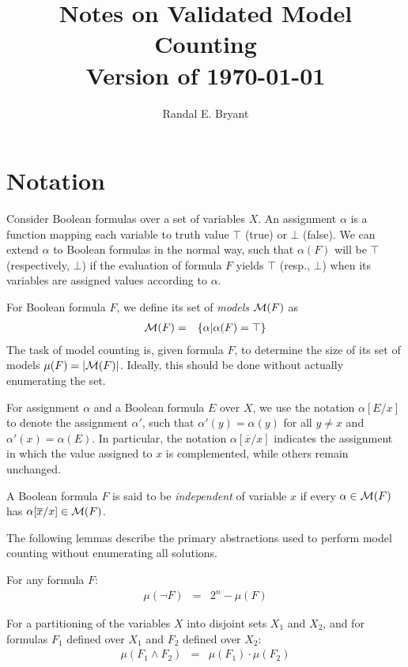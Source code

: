 \documentclass{llncs}
\title{Notes on Validated Model Counting \\ Version of \today}
\author{Randal E. Bryant}
\institute{
Computer Science Department \\
Carnegie Mellon University, Pittsburgh, PA, United States
}
\newcommand{\tautology}{\top}
\newcommand{\nil}{\bot}
\newcommand{\obar}[1]{\overline{#1}}
\newcommand{\interp}{\alpha}
\newcommand{\interpset}[1]{{\cal M}(#1)}
\newcommand{\mcount}{\mu}
\newcommand{\subs}[2]{[#2/#1]}
\newcommand{\subsflip}[1]{\subs{#1}{\obar{#1}}}
\begin{document}
\maketitle

\section{Notation}

Consider Boolean formulas over a set of variables $X$.  An
assignment $\interp$ is a function mapping each variable to 
truth value $\tautology$ (true) or $\nil$ (false).  We can extend
$\interp$ to Boolean formulas in the normal way, such that
$\interp(F)$ will be $\tautology$ (respectively, $\nil$) if the
evaluation of formula $F$ yields $\tautology$ (resp., $\nil$) when its
variables are assigned values according to $\interp$.

For Boolean formula $F$, we define its set of {\em models} $\interpset{F}$ as
\begin{eqnarray}
\interpset{F} & = & \{ \interp | \interp(F) = \tautology \}
\end{eqnarray}
The task of model counting is, given formula $F$, to determine the size of its set of models
$\mcount(F) = |\interpset{F}|$.  Ideally, this should be done without actually enumerating the set.

For assignment $\interp$ and a Boolean formula $E$ over $X$, we
use the notation $\interp\subs{x}{E}$ to denote the assignment
$\interp'$, such that $\interp'(y) = \interp(y)$ for all $y \not = x$
and $\interp'(x) = \interp(E)$.  In particular, the notation
$\interp\subsflip{x}$ indicates the assignment in which the value
assigned to $x$ is complemented, while others remain unchanged.

A Boolean formula $F$ is said to be {\em independent} of variable $x$
if every $\interp \in \interpset{F}$ has $\interp\subsflip{x} \in
\interpset{F}$.

The following lemmas describe the primary abstractions used to perform
model counting without enumerating all solutions.

\begin{lemma}
  \label{lemma:negation}
  For any formula $F$:
  \begin{eqnarray*}
    \mcount(\neg F) & =  & 2^n - \mcount(F)
  \end{eqnarray*}
\end{lemma}

\begin{lemma}
  \label{lemma:product}
  For a partitioning of the variables $X$ into disjoint sets $X_1$ and $X_2$, and for formulas $F_1$ defined over $X_1$ and $F_2$ defined over $X_2$:
  \begin{eqnarray*}
    \mcount(F_1 \land F_2) &=& \mcount(F_1) \cdot \mcount(F_2)
  \end{eqnarray*}
\end{lemma}
\end{document}
